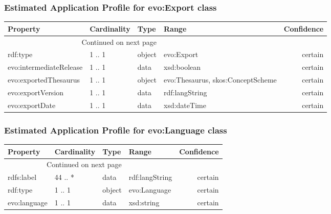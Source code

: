 \documentclass[10pt,a4paper,titlepage,final]{article}
\begin{document}
\subsubsection{Estimated Application Profile for evo:Export class}
\begin{tabularx}{\textwidth}{lllXr}
\toprule
                Property & Cardinality &    Type &                              Range & Confidence \\
\midrule
\endhead
\midrule
\multicolumn{3}{r}{{Continued on next page}} \\
\midrule
\endfoot

\bottomrule
\endlastfoot
                rdf:type &      1 .. 1 &  object &                         evo:Export &    certain \\
 evo:intermediateRelease &      1 .. 1 &    data &                        xsd:boolean &    certain \\
   evo:exportedThesaurus &      1 .. 1 &  object &  evo:Thesaurus, skos:ConceptScheme &    certain \\
       evo:exportVersion &      1 .. 1 &    data &                     rdf:langString &    certain \\
          evo:exportDate &      1 .. 1 &    data &                       xsd:dateTime &    certain \\
\end{tabularx}


\subsubsection{Estimated Application Profile for evo:Language class}
\begin{tabularx}{\textwidth}{lllXr}
\toprule
     Property & Cardinality &    Type &           Range & Confidence \\
\midrule
\endhead
\midrule
\multicolumn{3}{r}{{Continued on next page}} \\
\midrule
\endfoot

\bottomrule
\endlastfoot
   rdfs:label &     44 .. * &    data &  rdf:langString &    certain \\
     rdf:type &      1 .. 1 &  object &    evo:Language &    certain \\
 evo:language &      1 .. 1 &    data &      xsd:string &    certain \\
\end{tabularx}
\end{document}
